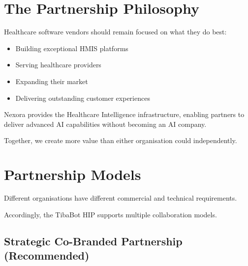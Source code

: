 
\section{The Partnership Philosophy}

Healthcare software vendors should remain focused on what they do best:

\begin{itemize}

\item Building exceptional HMIS platforms

\item Serving healthcare providers

\item Expanding their market

\item Delivering outstanding customer experiences

\end{itemize}

Nexora provides the Healthcare Intelligence infrastructure, enabling partners to deliver advanced AI capabilities without becoming an AI company.

Together, we create more value than either organisation could independently.


\section{Partnership Models}

Different organisations have different commercial and technical requirements.

Accordingly, the TibaBot HIP supports multiple collaboration models.


\subsection{Strategic Co-Branded Partnership (Recommended)}

